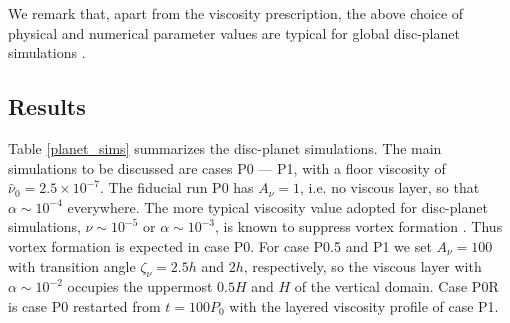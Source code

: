We remark that, apart from the viscosity prescription, the above
choice of physical and numerical parameter values are typical for
global disc-planet simulations \citep[e.g.][]{valborro06,mignone12}.    




\subsection{Results}
Table \ref{planet_sims} summarizes the disc-planet simulations. 
The main simulations to be discussed are cases P0 --- P1, with a floor
viscosity of $\hat{\nu}_0=2.5\times10^{-7}$. 
The fiducial run P0 has $A_\nu=1$, i.e. no viscous layer, so that $\alpha\sim 10^{-4}$ everywhere. 
The more typical viscosity value adopted for disc-planet simulations,
$\hat{\nu}\sim 10^{-5}$ or $\alpha\sim 10^{-3}$, is known to suppress vortex formation
\citep{valborro07, mudryk09}. Thus vortex formation is expected in 
case P0. For case P0.5 and P1 we set $A_\nu=100$ with transition angle $\zeta_\nu=2.5h$ and
$2h$, respectively, so the viscous layer with $\alpha\sim10^{-2}$ occupies the uppermost $0.5H$ and $H$ of the vertical
domain. Case P0R is case P0 restarted from 
$t=100P_0$ with the layered viscosity profile of case P1. 
 

